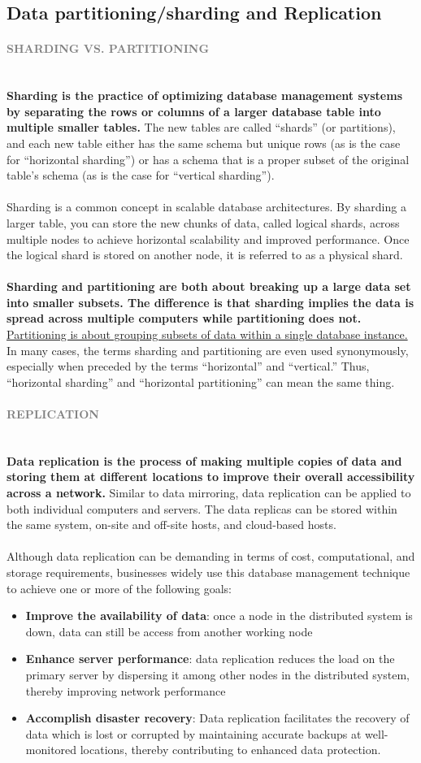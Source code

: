 \documentclass[10pt,a4paper]{article}
\newcommand{\nline}{\\~\\}
\newcommand{\myparagraph}[1]{\paragraph{\normalsize{\textcolor{gray}{\uppercase{\textbf{#1}}}} }\mbox{} \vspace{0.5em}\\}
\begin{document}
\subsection{Data partitioning/sharding and Replication}
\myparagraph{Sharding vs. Partitioning}
\textbf{Sharding is the practice of optimizing database management systems by separating the rows or columns of a larger database table into multiple smaller tables.} The new tables are called “shards” (or partitions), and each new table either has the same schema but unique rows (as is the case for “horizontal sharding”) or has a schema that is a proper subset of the original table’s schema (as is the case for “vertical sharding”).
\nline
Sharding is a common concept in scalable database architectures. By sharding a larger table, you can store the new chunks of data, called logical shards, across multiple nodes to achieve horizontal scalability and improved performance. Once the logical shard is stored on another node, it is referred to as a physical shard.
\nline
\textbf{Sharding and partitioning are both about breaking up a large data set into smaller subsets. The difference is that sharding implies the data is spread across multiple computers while partitioning does not.} \uline{Partitioning is about grouping subsets of data within a single database instance.} In many cases, the terms sharding and partitioning are even used synonymously, especially when preceded by the terms “horizontal” and “vertical.” Thus, “horizontal sharding” and “horizontal partitioning” can mean the same thing.
\pagebreak
\myparagraph{Replication}
\textbf{Data replication is the process of making multiple copies of data and storing them at different locations to improve their overall accessibility across a network.} Similar to data mirroring, data replication can be applied to both individual computers and servers. The data replicas can be stored within the same system, on-site and off-site hosts, and cloud-based hosts.
\nline
Although data replication can be demanding in terms of cost, computational, and storage requirements, businesses widely use this database management technique to achieve one or more of the following goals:
\begin{itemize}
	\item \textbf{Improve the availability of data}: once a node in the distributed system is down, data can still be access from another working node
	\item \textbf{Enhance server performance}: data replication reduces the load on the primary server by dispersing it among other nodes in the distributed system, thereby improving network performance
	\item \textbf{Accomplish disaster recovery}:  Data replication facilitates the recovery of data which is lost or corrupted by maintaining accurate backups at well-monitored locations, thereby contributing to enhanced data protection.
\end{itemize}
\end{document}
